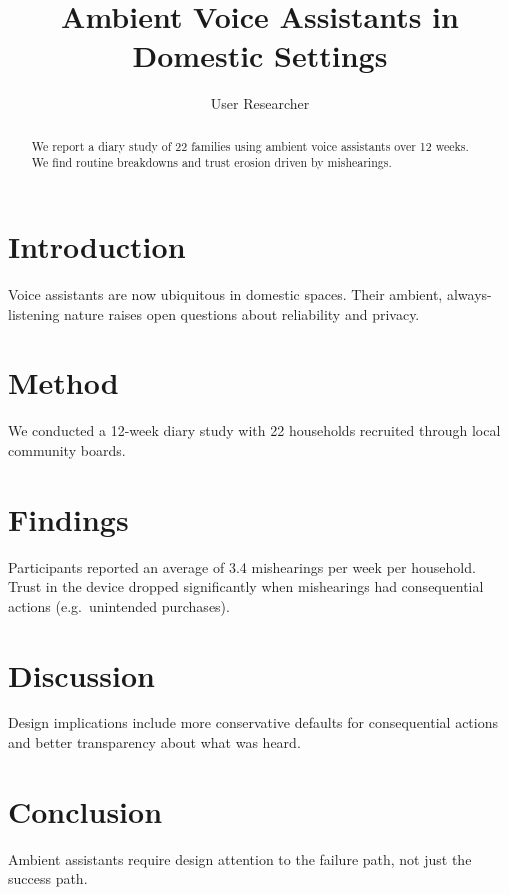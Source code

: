 \documentclass[sigchi]{acmart}
\begin{document}
\title{Ambient Voice Assistants in Domestic Settings}

\author{User Researcher}

\begin{abstract}
We report a diary study of 22 families using ambient voice assistants over 12 weeks. We find routine breakdowns and trust erosion driven by mishearings.
\end{abstract}



\maketitle

\section{Introduction}
Voice assistants are now ubiquitous in domestic spaces. Their ambient, always-listening nature raises open questions about reliability and privacy.

\section{Method}
We conducted a 12-week diary study with 22 households recruited through local community boards.

\section{Findings}
Participants reported an average of 3.4 mishearings per week per household. Trust in the device dropped significantly when mishearings had consequential actions (e.g.\ unintended purchases).

\section{Discussion}
Design implications include more conservative defaults for consequential actions and better transparency about what was heard.

\section{Conclusion}
Ambient assistants require design attention to the failure path, not just the success path.
\end{document}
